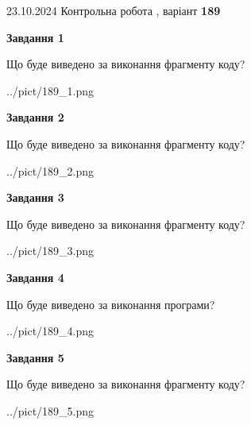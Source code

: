 \documentclass[12pt, ukrainian]{article}
\begin{document}
{\Large{23.10.2024 Контрольна робота , варіант  \No \textbf { 189 }\par}}
{
\begin {large}
{\begin {center}\textbf{Завдання 1}\end {center}}

Що буде виведено за виконання фрагменту коду?\par
\begin{center}
	{../pict/189_1.png}
\end{center}
\newpage

{\begin {center}\textbf{Завдання 2}\end {center}}

Що буде виведено за виконання фрагменту коду?\par
\begin{center}
	{../pict/189_2.png}
\end{center}
\newpage

{\begin {center}\textbf{Завдання 3}\end {center}}

Що буде виведено за виконання фрагменту коду?\par
\begin{center}
	{../pict/189_3.png}
\end{center}
\newpage

{\begin {center}\textbf{Завдання 4}\end {center}}

Що буде виведено за виконання програми?\par
\begin{center}
	{../pict/189_4.png}
\end{center}
\newpage

{\begin {center}\textbf{Завдання 5}\end {center}}

Що буде виведено за виконання фрагменту коду?\par
\begin{center}
	{../pict/189_5.png}
\end{center}
\newpage


\end{large}}
\end{document}
